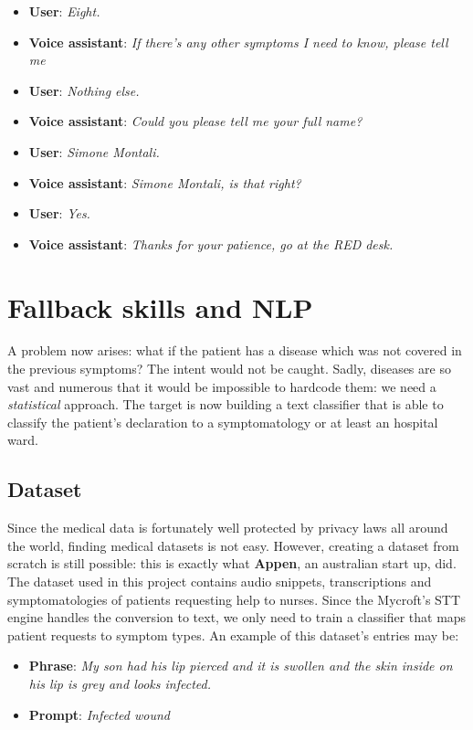 \documentclass[conference]{IEEEtran}
\begin{document}
\begin{itemize}
    \item \textbf{User}: \textit{Eight.}
    \item \textbf{Voice assistant}: \textit{If there's any other symptoms I need to know, please tell me}
    \item \textbf{User}: \textit{Nothing else.}
    \item \textbf{Voice assistant}: \textit{Could you please tell me your full name?}
    \item \textbf{User}: \textit{Simone Montali.}
    \item \textbf{Voice assistant}: \textit{Simone Montali, is that right?}
    \item \textbf{User}: \textit{Yes.}
    \item \textbf{Voice assistant}: \textit{Thanks for your patience, go at the RED desk.}
\end{itemize}
\section{Fallback skills and NLP}
\label{sec:fallback}
A problem now arises: what if the patient has a disease which was not covered in the previous symptoms? The intent would not be caught. Sadly, diseases are so vast and numerous that it would be impossible to hardcode them: we need a \textit{statistical} approach. The target is now building a text classifier that is able to classify the patient's declaration to a symptomatology or at least an hospital ward.
\subsection{Dataset}
Since the medical data is fortunately well protected by privacy laws all around the world, finding medical datasets is not easy. However, creating a dataset from scratch is still possible: this is exactly what \textbf{Appen}, an australian start up, did. The dataset used in this project \cite{dataset} contains audio snippets, transcriptions and symptomatologies of patients requesting help to nurses. Since the Mycroft's STT engine handles the conversion to text, we only need to train a classifier that maps patient requests to symptom types. An example of this dataset's entries may be:
\begin{itemize}
    \item \textbf{Phrase}: \textit{My son had his lip pierced and it is swollen and the skin inside
              on his lip is grey and looks infected.}
    \item \textbf{Prompt}: \textit{Infected wound}
\end{itemize}
\end{document}
